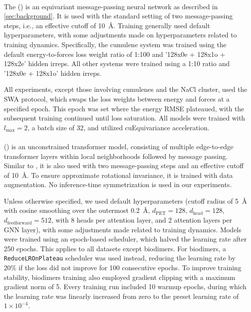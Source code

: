 \documentclass[10pt]{article} %
\begin{document}
\paragraph{\mace}
The \mace \mlp (\cite{bksoc2022}) is an equivariant message-passing neural network as described in \cref{sec:background}. It is used with the standard setting of two message-passing steps, i.e., an effective cutoff of \qty{10}{\angstrom}.
Training generally used default hyperparameters, with some adjustments made on hyperparameters related to training dynamics. Specifically, the cumulene system was trained using the default energy-to-forces loss weight ratio of 1:100 and '128x0e + 128x1o + 128x2e' hidden irreps. All other systems were trained using a 1:10 ratio and '128x0e + 128x1o' hidden irreps.

All experiments, except those involving cumulenes and the NaCl cluster, used the SWA protocol, which swaps the loss weights between energy and forces at a specified epoch. This epoch was set where the energy RMSE plateaued, with the subsequent training continued until loss saturation. All models were trained with $l_{\text{max}} = 2$, a batch size of 32, and utilized cuEquivariance acceleration.

\paragraph{\pet}
\pet (\cite{pc2023}) is an unconstrained transformer model, consisting of multiple edge-to-edge transformer layers within local neighborhoods followed by message passing. Similar to \mace, it is also used with two message-passing steps and an effective cutoff of \qty{10}{\angstrom}. To ensure approximate rotational invariance, it is trained with data augmentation. No inference-time symmetrization is used in our experiments.

Unless otherwise specified, we used default hyperparameters (cutoff radius of \qty{5}{\angstrom} with cosine smoothing over the outermost \qty{0.2}{\angstrom}, $d_{\text{PET}}=128$, $d_{\text{head}}=128$, $d_{\text{feedforward}}=512$, with 8 heads per attention layer, and 2 attention layers per GNN layer), with some adjustments made related to training dynamics. Models were trained using an epoch-based scheduler, which halved the learning rate after 250 epochs. This applies to all datasets except biodimers. For biodimers, a \texttt{ReduceLROnPlateau} scheduler was used instead, reducing the learning rate by 20\% if the loss did not improve for 100 consecutive epochs. To improve training stability, biodimers training also employed gradient clipping with a maximum gradient norm of 5. Every training run included 10 warmup epochs, during which the learning rate was linearly increased from zero to the preset learning rate of $1 \times 10^{-4}$.
\end{document}
